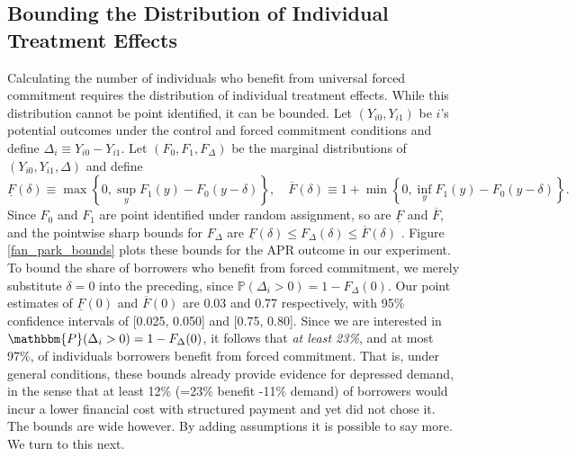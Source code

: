 \documentclass[12pt, a4paper]{article}
\begin{document}
\subsection{Bounding the Distribution of Individual Treatment Effects}
\label{sec:bounds}


Calculating the number of individuals who benefit from universal forced commitment requires the distribution of individual treatment effects.
While this distribution cannot be point identified, it can be bounded.
Let $(Y_{i0}, Y_{i1})$ be $i$'s potential outcomes under the control and forced commitment conditions and define $\Delta_i \equiv Y_{i0} - Y_{i1}$.
Let $(F_0, F_1, F_\Delta)$ be the marginal distributions of $(Y_{i0}, Y_{i1}, \Delta)$ and define 
\[
\underline{F}(\delta) \equiv \max \left\{0, \sup_y F_1(y) - F_0(y - \delta)  \right\}, \quad
\overline{F}(\delta) \equiv 1 + \min \left\{0, \inf_y F_1(y) - F_0(y-\delta) \right\}.
\]
Since $F_0$ and $F_1$ are point identified under random assignment, so are $\underline{F}$ and $\overline{F}$, and the pointwise sharp bounds for $F_\Delta$ are $\underline{F}(\delta) \leq F_\Delta(\delta) \leq \overline{F}(\delta)$ \citep{fan2010sharp}.
Figure \ref{fan_park_bounds} plots these bounds for the APR outcome in our experiment.  
To bound the share of borrowers who benefit from forced commitment, we merely substitute $\delta=0$ into the preceding, since $\mathbb{P}(\Delta_i > 0) = 1 - F_\Delta(0)$.
Our point estimates of $\underline{F}(0)$ and $\overline{F}(0)$ are 0.03 and 0.77 respectively, with 95\% confidence intervals of [0.025, 0.050] and [0.75, 0.80]. Since we are interested in $\mathbbm{P}(\Delta_i >0) = 1 - F_\Delta(0)$, it follows that \textit{at least 23\%}, and at most 97\%, of individuals borrowers benefit from forced commitment.%
That is, under general conditions, these bounds already provide evidence for depressed demand, in the sense that at least 12\% (=23\% benefit -11\% demand) of borrowers would incur a lower financial cost with structured payment and yet did not chose it. The bounds are wide however. By adding assumptions it is possible to say more. We turn to this next. %
\end{document}

